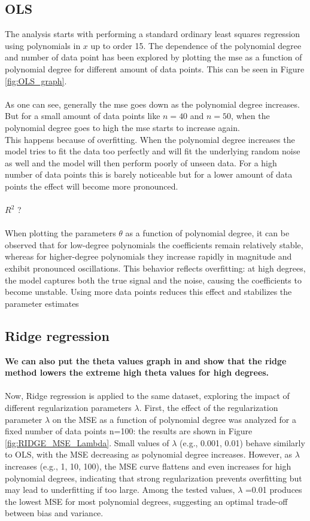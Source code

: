 \documentclass[
    article
 reprint,            %
 amsmath,amssymb,
 aps,
]{revtex4-2}
\begin{document}
\subsection{OLS}
\label{OLS}
The analysis starts with performing a standard ordinary least squares regression using polynomials in $x$ up to order 15. The dependence of the polynomial degree and number of data point has been explored by plotting the mse as a function of polynomial degree for different amount of data points. This can be seen in Figure \ref{fig:OLS_graph}.\\\\
As one can see, generally the mse goes down as the polynomial degree increases. But for a small amount of data points like $n = 40$ and $n = 50$, when the polynomial degree goes to high the mse starts to increase again.\\
This happens because of overfitting. When the polynomial degree increases the model tries to fit the data too perfectly and will fit the underlying random noise as well and the model will then perform poorly of unseen data. For a high number of data points this is barely noticeable but for a lower amount of data points the effect will become more pronounced.\\\\
$R^2$ ?\\\\
When plotting the parameters $\theta$ as a function of polynomial degree, it can be observed that for low-degree polynomials the coefficients remain relatively stable, whereas for higher-degree polynomials they increase rapidly in magnitude and exhibit pronounced oscillations.
This behavior reflects overfitting: at high degrees, the model captures both the true signal and the noise, causing the coefficients to become unstable. Using more data points reduces this effect and stabilizes the parameter estimates
    


\subsection{Ridge regression}
\label{Ridge regression}
\textbf{We can also put the theta values graph in and show that the ridge method lowers the extreme high theta values for high degrees.}\\\\
Now, Ridge regression is applied to the same dataset, exploring the impact of different regularization parameters $\lambda$. First, the effect of the regularization parameter $\lambda $ on the MSE as a function of polynomial degree was analyzed for a fixed number of data points n=100: the results are shown in Figure \ref{fig:RIDGE_MSE_Lambda}.
Small values of $\lambda$ (e.g., 0.001, 0.01) behave similarly to OLS, with the MSE decreasing as polynomial degree increases. However, as $\lambda$ increases (e.g., 1, 10, 100), the MSE curve flattens and even increases for high polynomial degrees, indicating that strong regularization prevents overfitting but may lead to underfitting if too large.
Among the tested values, $\lambda$ =0.01 produces the lowest MSE for most polynomial degrees, suggesting an optimal trade-off between bias and variance.
\end{document}

